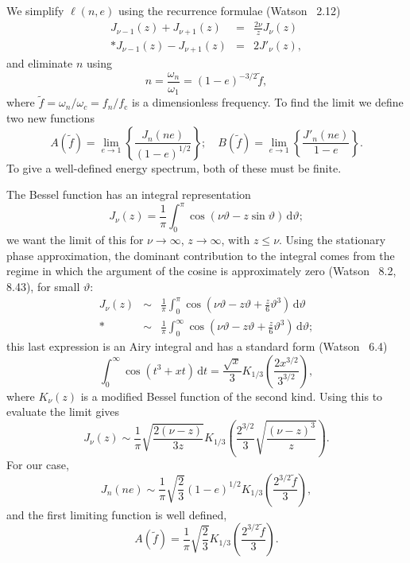 \documentclass[aps,prd,amsfonts,amssymb,amsmath,nofootinbib,floatfix,reprint,showpacs,groupedaddress]{revtex4-1}
\newcommand{\sub}[1]{\ensuremath{_\text{#1}}}
\newcommand{\dd}{\ensuremath{\mathrm{d}}}
\newcommand{\intd}[4]{\ensuremath{\int_{#1}^{#2}{#3}\,\dd{#4}}}
\newcommand{\recip}[1]{\ensuremath{\frac{1}{#1}}}
\begin{document}
We simplify $\ell(n,e)$ using the recurrence formulae (Watson~\cite{Watson1995} 2.12)
\begin{eqnarray}
J_{\nu-1}(z) + J_{\nu+1}(z) & = & \frac{2\nu}{z}J_\nu(z)\\*
J_{\nu-1}(z) - J_{\nu+1}(z) & = & 2J'_\nu(z),\label{eq:J_derivative}
\end{eqnarray}
and eliminate $n$ using
\begin{equation}
n = \frac{\omega_n}{\omega_1} = (1-e)^{-3/2}\tilde{f},
\end{equation}
where $\tilde{f} = \omega_n/\omega_{c} = f_n/f\sub{c}$ is a dimensionless frequency. To find the limit we define two new functions
\begin{equation}
A(\tilde{f}) = \lim_{e\rightarrow 1}\left\{\frac{J_n(ne)}{(1-e)^{1/2}}\right\}; \quad B(\tilde{f}) = \lim_{e\rightarrow 1}\left\{\frac{J'_n(ne)}{1-e}\right\}.
\end{equation}
To give a well-defined energy spectrum, both of these must be finite.

The Bessel function has an integral representation
\begin{equation}
J_\nu(z) = \recip{\pi}\intd{0}{\pi}{\cos(\nu\vartheta - z\sin\vartheta)}{\vartheta};
\end{equation}
we want the limit of this for $\nu \rightarrow \infty$, $z \rightarrow \infty$, with $z \leq \nu$. Using the stationary phase approximation, the dominant contribution to the integral comes from the regime in which the argument of the cosine is approximately zero (Watson~\cite{Watson1995} 8.2, 8.43), for small $\vartheta$:
\begin{eqnarray}
J_\nu(z) & \sim & \recip{\pi}\intd{0}{\pi}{\cos\left(\nu\vartheta - z\vartheta + \frac{z}{6}\vartheta^3\right)}{\vartheta}\\*
 & \sim & \recip{\pi}\intd{0}{\infty}{\cos\left(\nu\vartheta - z\vartheta + \frac{z}{6}\vartheta^3\right)}{\vartheta};
\end{eqnarray}
this last expression is an Airy integral and has a standard form (Watson~\cite{Watson1995} 6.4)
\begin{equation}
\intd{0}{\infty}{\cos(t^3 + xt)}{t} = \frac{\sqrt{x}}{3}K_{1/3}\left(\frac{2x^{3/2}}{3^{3/2}}\right),
\end{equation}
where $K_\nu(z)$ is a modified Bessel function of the second kind. Using this to evaluate the limit gives
\begin{equation}
J_\nu(z) \sim \recip{\pi}\sqrt{\frac{2(\nu - z)}{3z}}K_{1/3}\left(\frac{2^{3/2}}{3}\sqrt{\frac{(\nu -z)^3}{z}}\right).
\label{eq:J_nu}
\end{equation}
For our case,
\begin{equation}
J_n(ne) \sim \recip{\pi}\sqrt{\frac{2}{3}}(1-e)^{1/2}K_{1/3}\left(\frac{2^{3/2}\tilde{f}}{3}\right),
\end{equation}
and the first limiting function is well defined,
\begin{equation}
A(\tilde{f}) = \recip{\pi}\sqrt{\frac{2}{3}}K_{1/3}\left(\frac{2^{3/2}\tilde{f}}{3}\right).
\end{equation}
\end{document}
